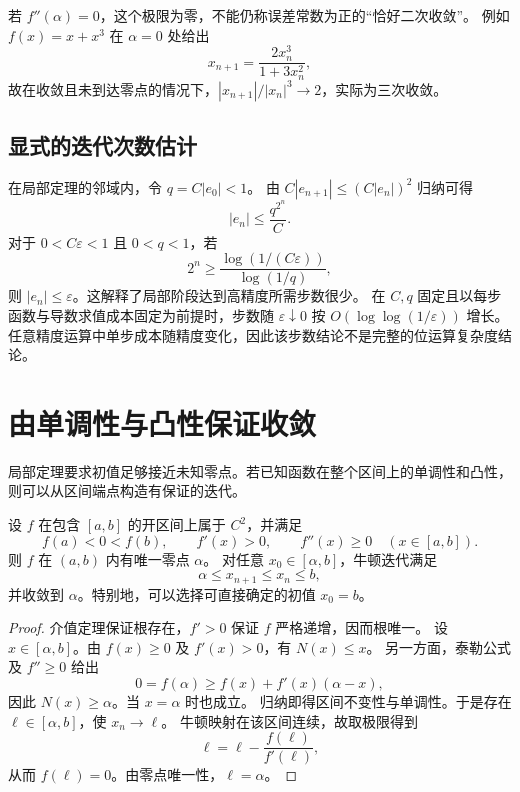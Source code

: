 \documentclass{ctexart}
\begin{document}
若 $f''(\alpha)=0$，这个极限为零，不能仍称误差常数为正的“恰好二次收敛”。
例如 $f(x)=x+x^3$ 在 $\alpha=0$ 处给出
\[
  x_{n+1}=\frac{2x_n^3}{1+3x_n^2},
\]
故在收敛且未到达零点的情况下，$|x_{n+1}|/|x_n|^3\to2$，实际为三次收敛。

\subsection{显式的迭代次数估计}

在局部定理的邻域内，令 $q=C|e_0|<1$。
由 $C|e_{n+1}|\le(C|e_n|)^2$ 归纳可得
\begin{equation}\label{eq:newton-double-exponential}
  |e_n|\le\frac{q^{2^n}}{C}.
\end{equation}
对于 $0<C\varepsilon<1$ 且 $0<q<1$，若
\[
  2^n\ge\frac{\log(1/(C\varepsilon))}{\log(1/q)},
\]
则 $|e_n|\le\varepsilon$。这解释了局部阶段达到高精度所需步数很少。
在 $C,q$ 固定且以每步函数与导数求值成本固定为前提时，步数随
$\varepsilon\downarrow0$ 按 $O(\log\log(1/\varepsilon))$ 增长。
任意精度运算中单步成本随精度变化，因此该步数结论不是完整的位运算复杂度结论。

\section{由单调性与凸性保证收敛}
\label{sec:newton-monotone}

局部定理要求初值足够接近未知零点。若已知函数在整个区间上的单调性和凸性，
则可以从区间端点构造有保证的迭代。

\begin{theorem}[递增凸函数的单调牛顿迭代]\label{thm:newton-monotone}
设 $f$ 在包含 $[a,b]$ 的开区间上属于 $C^2$，并满足
\[
  f(a)<0<f(b),\qquad f'(x)>0,\qquad f''(x)\ge0
  \quad(x\in[a,b]).
\]
则 $f$ 在 $(a,b)$ 内有唯一零点 $\alpha$。
对任意 $x_0\in[\alpha,b]$，牛顿迭代满足
\[
  \alpha\le x_{n+1}\le x_n\le b,
\]
并收敛到 $\alpha$。特别地，可以选择可直接确定的初值 $x_0=b$。
\end{theorem}

\begin{proof}
介值定理保证根存在，$f'>0$ 保证 $f$ 严格递增，因而根唯一。
设 $x\in[\alpha,b]$。由 $f(x)\ge0$ 及 $f'(x)>0$，有 $N(x)\le x$。
另一方面，泰勒公式及 $f''\ge0$ 给出
\[
  0=f(\alpha)\ge f(x)+f'(x)(\alpha-x),
\]
因此 $N(x)\ge\alpha$。当 $x=\alpha$ 时也成立。
归纳即得区间不变性与单调性。于是存在 $\ell\in[\alpha,b]$，使 $x_n\to\ell$。
牛顿映射在该区间连续，故取极限得到
\[
  \ell=\ell-\frac{f(\ell)}{f'(\ell)},
\]
从而 $f(\ell)=0$。由零点唯一性，$\ell=\alpha$。
\end{proof}
\end{document}

